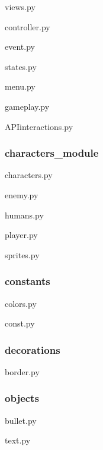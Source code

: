 views.py


controller.py


event.py


states.py


menu.py


gameplay.py


APIinteractions.py


\subsubsection{characters\_module}
characters.py

enemy.py


humans.py


player.py


sprites.py


\subsubsection{constants}

colors.py


const.py


\subsubsection{decorations}
border.py


\subsubsection{objects}
bullet.py


text.py

